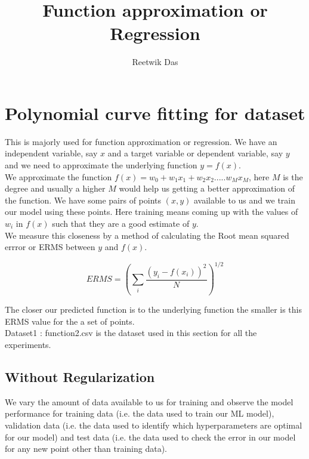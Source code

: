 \documentclass[11pt]{article}
\title{Function approximation or Regression}
\author{Reetwik Das}
\begin{document}
\maketitle
\newpage
\tableofcontents
\listoftables
\listoffigures

\newpage 

\section{Polynomial curve fitting for dataset}
This is majorly used for function approximation or regression. We have an independent variable, say $x$ and a target variable or dependent variable, say $y$ and we need to approximate the underlying function $ y = f(x)$.\\

We approximate the function $f(x) = w_{0}+w_{1}x_1 + w_2x_{2} ..... w_Mx_M$, here $M$ is the degree and usually a higher $M$ would help us getting a better approximation of the function. We have some pairs of points $(x,y)$ available to us and we train our model using these points. Here training means coming up with the values of $w_i$ in $f(x)$ such that they are a good estimate of $y$.\\

We measure this closeness by a method of calculating the Root mean squared errror or ERMS between $y$ and $f(x)$.

$$ ERMS = { \left( \sum_{i} \frac{{(y_i-f(x_i))}^2}{N} \right) }^{1/2} $$

The closer our predicted function is to the underlying function the smaller is this ERMS value for the a set of points.\\

 
Dataset1 : function2.csv is the dataset used in this section for all the experiments.

\subsection{Without Regularization}
We vary the amount of data available to us for training and observe the model performance for training data (i.e. the data used to train our ML model), validation data (i.e. the data used to identify which hyperparameters are optimal for our model) and test data (i.e. the data used to check the error in our model for any new point other than training data).
 
\end{document}

